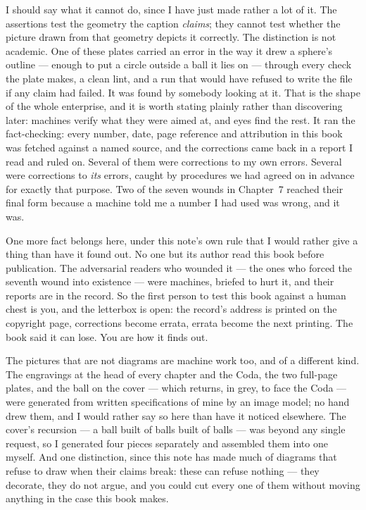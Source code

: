 \documentclass[fontsize=11pt,paper=a4,pagesize=auto,parskip=half-]{scrbook}
\begin{document}
I should say what it cannot do, since I have just made rather a lot of it. The assertions test the geometry the caption \emph{claims}; they cannot test whether the picture drawn from that geometry depicts it correctly. The distinction is not academic. One of these plates carried an error in the way it drew a sphere's outline --- enough to put a circle outside a ball it lies on --- through every check the plate makes, a clean lint, and a run that would have refused to write the file if any claim had failed. It was found by somebody looking at it. That is the shape of the whole enterprise, and it is worth stating plainly rather than discovering later: machines verify what they were aimed at, and eyes find the rest. It ran the fact-checking: every number, date, page reference and attribution in this book was fetched against a named source, and the corrections came back in a report I read and ruled on. Several of them were corrections to my own errors. Several were corrections to \emph{its} errors, caught by procedures we had agreed on in advance for exactly that purpose. Two of the seven wounds in Chapter~7 reached their final form because a machine told me a number I had used was wrong, and it was.

One more fact belongs here, under this note's own rule that I would rather give a thing than have it found out. No one but its author read this book before publication. The adversarial readers who wounded it --- the ones who forced the seventh wound into existence --- were machines, briefed to hurt it, and their reports are in the record. So the first person to test this book against a human chest is you, and the letterbox is open: the record's address is printed on the copyright page, corrections become errata, errata become the next printing. The book said it can lose. You are how it finds out.

The pictures that are not diagrams are machine work too, and of a different kind. The engravings at the head of every chapter and the Coda, the two full-page plates, and the ball on the cover --- which returns, in grey, to face the Coda --- were generated from written specifications of mine by an image model; no hand drew them, and I would rather say so here than have it noticed elsewhere. The cover's recursion --- a ball built of balls built of balls --- was beyond any single request, so I generated four pieces separately and assembled them into one myself. And one distinction, since this note has made much of diagrams that refuse to draw when their claims break: these can refuse nothing --- they decorate, they do not argue, and you could cut every one of them without moving anything in the case this book makes.
\end{document}
